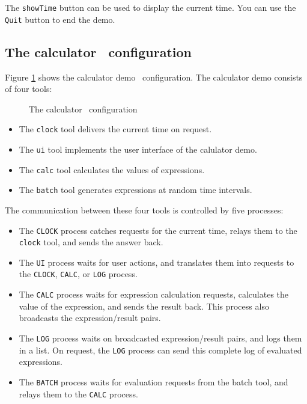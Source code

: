 \documentclass[a4,twoside,noweb]{article} %
\begin{document}
The {\tt showTime} button can be used to display the current time.
You can use the {\tt Quit} button to end the demo.

\subsection{The calculator \TB\ configuration}

Figure \ref{calc-impl} shows the calculator demo \TB\ configuration.
The calculator demo consists of four tools:

\begin{figure}[htb]
\centerline{}
\caption{The calculator \TB\ configuration}
\label{calc-impl}
\end{figure}

\begin{itemize}
\item The {\tt clock} tool delivers the current time on request.
\item The {\tt ui} tool implements the user interface of the calulator demo.
\item The {\tt calc} tool calculates the values of expressions.
\item The {\tt batch} tool generates expressions at random time intervals.
\end{itemize}

The communication between these four tools is controlled by five processes:
\begin{itemize}
\item The {\tt CLOCK} process catches requests for the current time,
      relays them to the {\tt clock} tool, and sends the answer back.
\item The {\tt UI} process waits for user actions, and translates
      them into requests to the {\tt CLOCK}, {\tt CALC}, or {\tt LOG}
      process.
\item The {\tt CALC} process waits for expression calculation requests,
      calculates the value of the expression, and sends the result back.
      This process also broadcasts the expression/result pairs.
\item The {\tt LOG} process waits on broadcasted expression/result pairs,
      and logs them in a list.
      On request, the {\tt LOG} process can send this complete log of
      evaluated expressions.
\item The {\tt BATCH} process waits for evaluation requests from the
      batch tool, and relays them to the {\tt CALC} process.
\end{itemize}
\end{document}
